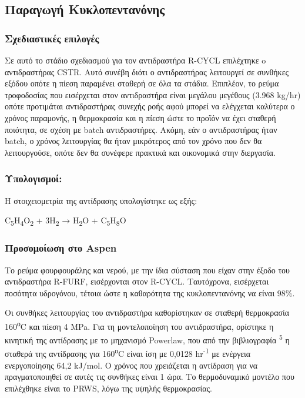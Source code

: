 \documentclass[11pt]{article}
\makeatletter
\newcommand{\citeprocitem}[2]{\hyper@linkstart{cite}{citeproc_bib_item_#1}#2\hyper@linkend}
\makeatother
\begin{document}
\subsection{Παραγωγή Κυκλοπεντανόνης}
\label{sec:orgb545fd1}
\subsubsection{Σχεδιαστικές επιλογές}
\label{sec:org9c45109}
Σε αυτό το στάδιο σχεδιασμού για τον αντιδραστήρα R-CYCL επιλέχτηκε o
αντιδραστήρας CSTR. Αυτό συνέβη διότι ο αντιδραστήρας λειτουργεί σε
συνθήκες εξόδου οπότε η πίεση παραμένει σταθερή σε όλα τα στάδια.
Επιπλέον, το ρεύμα τροφοδοσίας που εισέρχεται στον αντιδραστήρα είναι
μεγάλου μεγέθους (3.968 kg/hr) οπότε προτιμάται αντιδραστήρας συνεχής
ροής αφού μπορεί να ελέγχεται καλύτερα ο χρόνος παραμονής, η θερμοκρασία
και η πίεση ώστε το προϊόν να έχει σταθερή ποιότητα, σε σχέση με batch
αντιδραστήρες. Ακόμη, εάν ο αντιδραστήρας ήταν batch, ο χρόνος
λειτουργίας θα ήταν μικρότερος από τον χρόνο που δεν θα λειτουργούσε,
οπότε δεν θα συνέφερε πρακτικά και οικονομικά στην διεργασία.

\subsubsection{Υπολογισμοί:}
\label{sec:org9f84829}
Η στοιχειομετρία της αντίδρασης υπολογίστηκε ως εξής:

C\textsubscript{5}H\textsubscript{4}O\textsubscript{2} + 3H\textsubscript{2} → H\textsubscript{2}O + C\textsubscript{5}H\textsubscript{8}O

\subsubsection{Προσομοίωση στο Aspen}
\label{sec:orgbcc4c84}
Το ρεύμα φουρφουράλης και νερού, με την ίδια σύσταση που είχαν στην
έξοδο του αντιδραστήρα R-FURF, εισέρχονται στον R-CYCL. Ταυτόχρονα,
εισέρχεται ποσότητα υδρογόνου, τέτοια ώστε η καθαρότητα της κυκλοπεντανόνης
να είναι \(98 \%\).

Οι συνθήκες λειτουργίας του αντιδραστήρα καθορίστηκαν σε σταθερή
θερμοκρασία 160\textsuperscript{ο}C και πίεση 4 MPa. Για τη μοντελοποίηση του
αντιδραστήρα, ορίστηκε η κινητική της αντίδρασης με το μηχανισμό
Powerlaw, που από την βιβλιογραφία \textsuperscript{\citeprocitem{5}{5}} η σταθερά της
αντίδρασης για 160\textsuperscript{ο}C είναι ίση με 0,0128 hr\textsuperscript{-1} με ενέργεια
ενεργοποίησης 64,2 kJ/mol. Ο χρόνος που χρειάζεται η αντίδραση για να
πραγματοποιηθεί σε αυτές τις συνθήκες είναι 1 ώρα. Το θερμοδυναμικό
μοντέλο που επιλέχθηκε είναι το PRWS, λόγω της υψηλής θερμοκρασίας.
\end{document}
